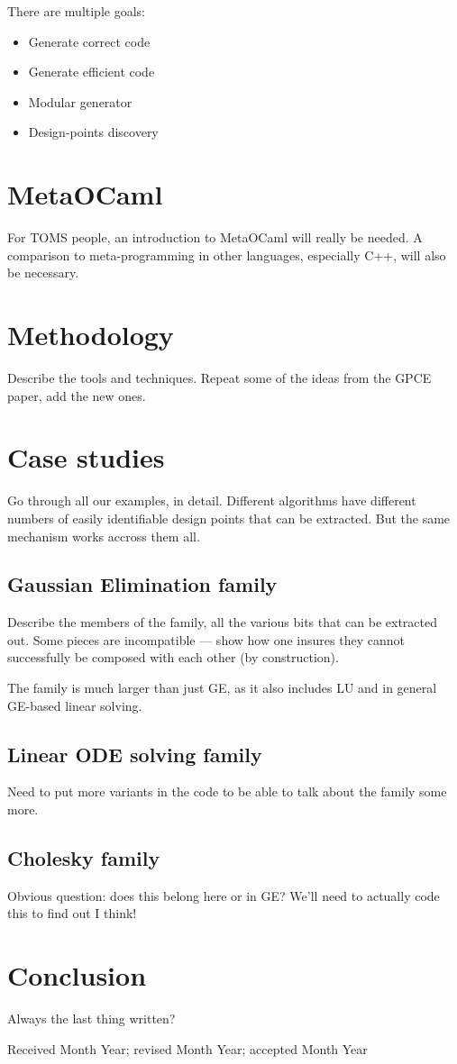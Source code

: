 \documentclass[acmtoms]{acmtrans2m}
\begin{document}
There are multiple goals:
\begin{itemize}
\item Generate correct code
\item Generate efficient code
\item Modular generator
\item Design-points discovery
\end{itemize}

\section{MetaOCaml}
For TOMS people, an introduction to MetaOCaml will really be needed.  A
comparison to meta-programming in other languages, especially C++, will
also be necessary.

\section{Methodology}
Describe the tools and techniques.  Repeat some of the ideas from the 
GPCE paper, add the new ones.

\section{Case studies}
Go through all our examples, in detail.  Different algorithms have 
different numbers of easily identifiable design points that can be
extracted.  But the same mechanism works accross them all.

\subsection{Gaussian Elimination family}
Describe the members of the family, all the various bits that can be
extracted out.  Some pieces are incompatible --- show how one insures
they cannot successfully be composed with each other (by construction).

The family is much larger than just GE, as it also includes LU and
in general GE-based linear solving.

\subsection{Linear ODE solving family}
Need to put more variants in the code to be able to talk about the 
family some more.

\subsection{Cholesky family}
Obvious question: does this belong here or in GE?  We'll need to 
actually code this to find out I think!


\section{Conclusion}
Always the last thing written?



\begin{received}
Received Month Year; revised Month Year; accepted Month Year
\end{received}
\end{document}
